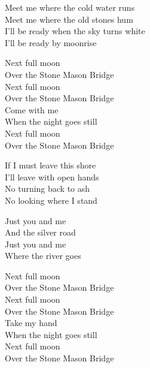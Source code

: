 \begin{lyrics}
Meet me where the cold water runs\\
Meet me where the old stones hum\\
I’ll be ready when the sky turns white\\
I’ll be ready by moonrise

Next full moon\\
Over the Stone Mason Bridge\\
Next full moon\\
Over the Stone Mason Bridge\\
Come with me\\
When the night goes still\\
Next full moon\\
Over the Stone Mason Bridge

If I must leave this shore\\
I’ll leave with open hands\\
No turning back to ash\\
No looking where I stand

Just you and me\\
And the silver road\\
Just you and me\\
Where the river goes

Next full moon\\
Over the Stone Mason Bridge\\
Next full moon\\
Over the Stone Mason Bridge\\
Take my hand\\
When the night goes still\\
Next full moon\\
Over the Stone Mason Bridge
\end{lyrics}

